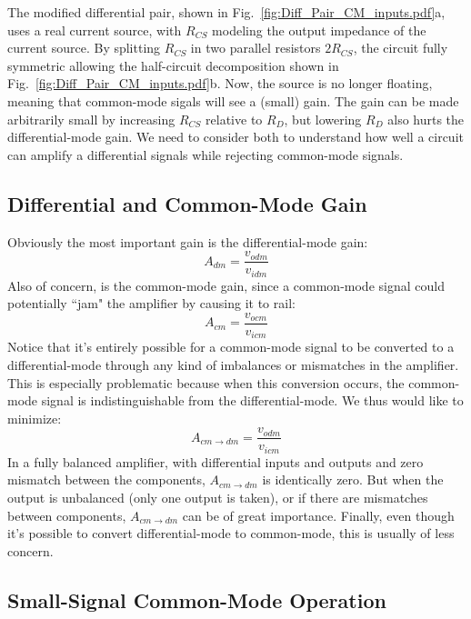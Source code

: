 The modified differential pair, shown in Fig.~\ref{fig:Diff_Pair_CM_inputs.pdf}a, uses a real current source, with $R_{CS}$ modeling the output impedance of the current source.  By splitting $R_{CS}$ in two parallel resistors $2R_{CS}$, the circuit fully symmetric allowing the half-circuit decomposition shown in Fig.~\ref{fig:Diff_Pair_CM_inputs.pdf}b.  Now, the source is no longer floating, meaning that common-mode sigals will see a (small) gain.  The gain can be made arbitrarily small by increasing $R_{CS}$ relative to $R_D$, but lowering $R_D$ also hurts the differential-mode gain.  We need to consider both to understand how well a circuit can amplify a differential signals while rejecting common-mode signals.


\subsection{Differential and Common-Mode Gain}

Obviously the most important gain is the differential-mode gain:
%
\begin{equation}
	A_{dm} = \frac{v_{odm}}{v_{idm}}
\end{equation}
%
Also of concern, is the common-mode gain, since a common-mode signal could potentially ``jam" the amplifier by causing it to rail:
%
\begin{equation}
	A_{cm} = \frac{v_{ocm}}{v_{icm}}
\end{equation}
%
Notice that it's entirely possible for a common-mode signal to be converted to a differential-mode through any kind of imbalances or mismatches in the amplifier.  This is especially problematic because when this conversion occurs, the common-mode signal is indistinguishable from the differential-mode.  We thus would like to minimize:
%
\begin{equation}
	A_{cm \to dm} = \frac{v_{odm}}{v_{icm}}
\end{equation}
%
In a fully balanced amplifier, with differential inputs and outputs and zero mismatch between the components, $A_{cm \to dm}$ is identically zero.  But when the output is unbalanced (only one output is taken), or if there are mismatches between components, $A_{cm \to dm}$ can be of great importance.  Finally, even though it's possible to convert differential-mode to common-mode, this is usually of less concern.  
 

\subsection{Small-Signal Common-Mode Operation}

